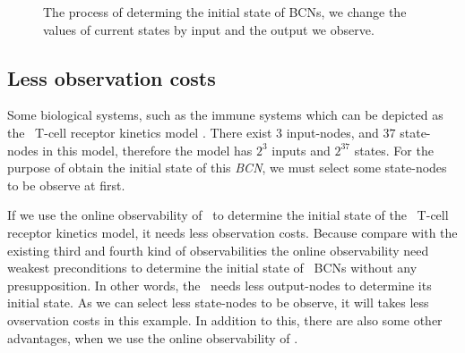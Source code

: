 \begin{figure}[thpb]
      \centering
      
      \caption{The process of determing the initial state of BCNs, we change the values of current states by input and the output we observe. }
      \label{fig:5}
   \end{figure}
\subsection{Less observation costs}
Some biological systems, such as the immune systems which can be depicted as the \BCN\ T-cell receptor kinetics model \cite{Klamt2006A}. There exist $3$ input-nodes, and $37$ state-nodes in this model, therefore the model has $2^3$ inputs and $2^{37}$ states. For the purpose of obtain the initial state of this {\em BCN}, we must select some state-nodes to be observe at first. 

If we use the online observability of \BCNs\ to determine the initial state of the \BCN\ T-cell receptor kinetics model, it needs less observation costs. Because compare with the existing third and fourth kind of observabilities the online observability need weakest preconditions to determine the initial state of {\ BCNs} without any presupposition. In other words, the \BCNs\ needs less output-nodes to determine its initial state. As we can select less state-nodes to be observe, it will takes less ovservation costs in this example. In addition to this, there are also some other advantages, when we use the online observability of \BCNs.

